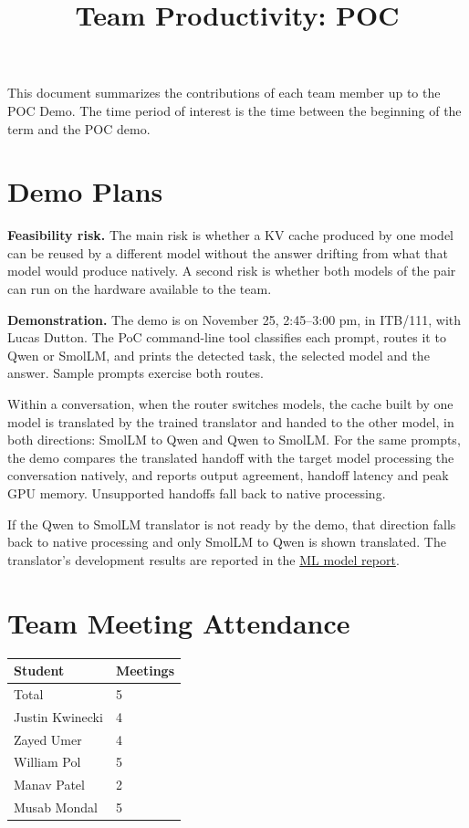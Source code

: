 \documentclass{article}
\title{Team Productivity: POC\\\progname}
\author{\authname}
\date{}
\begin{document}
\maketitle

This document summarizes the contributions of each team member up to the POC
Demo.  The time period of interest is the time between the beginning of the term
and the POC demo.

\section{Demo Plans}

\textbf{Feasibility risk.} The main risk is whether a KV cache produced by one
model can be reused by a different model without the answer drifting from what
that model would produce natively. A second risk is whether both models of the
pair can run on the hardware available to the team.

\textbf{Demonstration.} The demo is on November 25, 2:45--3:00 pm, in ITB/111,
with Lucas Dutton. The PoC command-line tool classifies each prompt, routes it
to Qwen or SmolLM, and prints the detected task, the selected model and the
answer. Sample prompts exercise both routes.

Within a conversation, when the router switches models, the cache built by one
model is translated by the trained translator and handed to the other model,
in both directions: SmolLM to Qwen and Qwen to SmolLM.
For the same prompts, the demo compares the translated handoff with the target
model processing the conversation natively, and reports output agreement,
handoff latency and peak GPU memory. Unsupported handoffs fall back
to native processing.

If the Qwen to SmolLM translator is not ready by the demo, that direction falls
back to native processing and only SmolLM to Qwen is shown translated. The
translator's development results are reported in the
\href{https://tandemkv.github.io/Tandem/CDs/MLReport/main.pdf}
{ML model report}.

\section{Team Meeting Attendance}

\begin{table}[H]
\centering
\begin{tabular}{ll}
\toprule
\textbf{Student} & \textbf{Meetings}\\
\midrule
Total & 5\\
Justin Kwinecki & 4\\
Zayed Umer & 4\\
William Pol & 5\\
Manav Patel & 2\\
Musab Mondal & 5\\
\bottomrule
\end{tabular}
\end{table}
\end{document}
